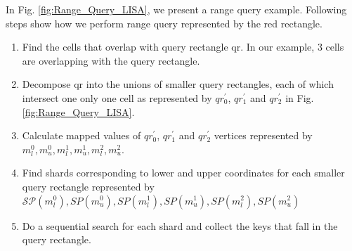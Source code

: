 \begin{mscexample}
	In Fig. \ref{fig:Range_Query_LISA}, we present a range query example. Following steps show how we perform range query represented by the red rectangle.
	\begin{enumerate}
		\item Find the cells that overlap with query rectangle qr. In our example, 3 cells are overlapping with the query rectangle. 
		\item Decompose qr into the unions of smaller query rectangles, each of which intersect one only one cell as represented by $qr_{0}^{'}$, $qr_{1}^{'}$ and $qr_{2}^{'}$ in Fig. \ref{fig:Range_Query_LISA}.
		
		\item Calculate mapped values of $qr_{0}^{'}$, $qr_{1}^{'}$ and $qr_{2}^{'}$ vertices represented by \\
		$m_{l}^{0}, m_{u}^{0}, m_{l}^{1}, m_{u}^{1}, m_{l}^{2}, m_{u}^{2} $.
		\item Find shards corresponding to lower and upper coordinates for each smaller query rectangle represented by 
		$\mathcal{SP}(m_{l}^{0}),SP{(m_{u}^{0})},{SP}(m_{l}^{1}),SP{(m_{u}^{1})}, {SP}(m_{l}^{2}),SP{(m_{u}^{2})} $
		\item Do a sequential search for  each shard and collect the keys that fall in the query rectangle. 
	\end{enumerate}
\end{mscexample}

